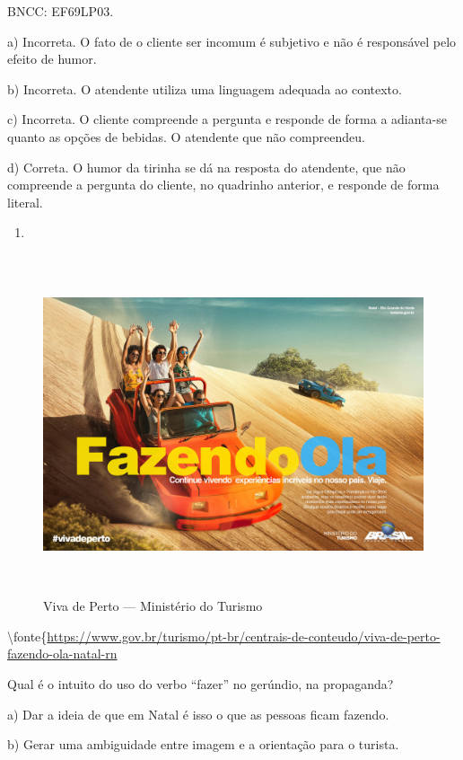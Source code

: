 BNCC: EF69LP03.

a) Incorreta. O fato de o cliente ser incomum é subjetivo e não é
responsável pelo efeito de humor.

b) Incorreta. O atendente utiliza uma linguagem adequada ao contexto.

c) Incorreta. O cliente compreende a pergunta e responde de forma a
adianta-se quanto as opções de bebidas. O atendente que não compreendeu.

d) Correta. O humor da tirinha se dá na resposta do atendente, que não
compreende a pergunta do cliente, no quadrinho anterior, e responde de
forma literal.

\begin{enumerate}
\def\labelenumi{\arabic{enumi}.}
\setcounter{enumi}{12}
\tightlist
\item
\end{enumerate}

\begin{figure}
\centering
\includegraphics[width=5.90556in,height=3.93403in]{./imgSAEB_6_POR/media/image43.jpeg}
\caption{Viva de Perto --- Ministério do Turismo}
\end{figure}

\textbackslash fonte\{\url{https://www.gov.br/turismo/pt-br/centrais-de-conteudo/viva-de-perto-fazendo-ola-natal-rn}

Qual é o intuito do uso do verbo ``fazer'' no gerúndio, na propaganda?

a) Dar a ideia de que em Natal é isso o que as pessoas ficam fazendo.

b) Gerar uma ambiguidade entre imagem e a orientação para o turista.

